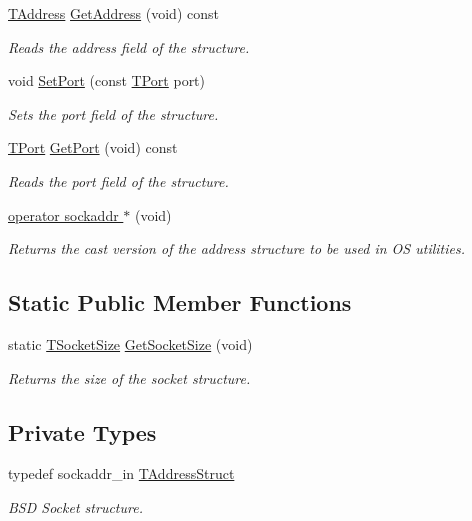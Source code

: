 \begin{DoxyCompactItemize}
\hyperlink{class_i_p_address_a36831f63346275f44e8747d77a2a5d51}{T\-Address} \hyperlink{class_i_p_address_a00ed9d09c9ec8f1d9568466683606e55}{Get\-Address} (void) const 
\begin{DoxyCompactList}\small\item\em Reads the address field of the structure. \end{DoxyCompactList}\item 
void \hyperlink{class_i_p_address_a5908d6242879f0e45685f8b0734dafa7}{Set\-Port} (const \hyperlink{class_i_p_address_a51188195685c31d4258c0a078cc37154}{T\-Port} port)
\begin{DoxyCompactList}\small\item\em Sets the port field of the structure. \end{DoxyCompactList}\item 
\hyperlink{class_i_p_address_a51188195685c31d4258c0a078cc37154}{T\-Port} \hyperlink{class_i_p_address_a92d27804d27e1fef93afd0137fe4eb08}{Get\-Port} (void) const 
\begin{DoxyCompactList}\small\item\em Reads the port field of the structure. \end{DoxyCompactList}\item 
\hyperlink{class_i_p_address_ac7a02f2b922b3b3c929ae3ad079ac8e9}{operator sockaddr $\ast$} (void)
\begin{DoxyCompactList}\small\item\em Returns the cast version of the address structure to be used in O\-S utilities. \end{DoxyCompactList}\end{DoxyCompactItemize}
\subsection*{Static Public Member Functions}
\begin{DoxyCompactItemize}
\item 
static \hyperlink{class_i_p_address_a28c76ca7e5d4aa86d2caf0b742a23cdb}{T\-Socket\-Size} \hyperlink{class_i_p_address_abdbc7cc25dc15d9e85ceb2e1d3125e22}{Get\-Socket\-Size} (void)
\begin{DoxyCompactList}\small\item\em Returns the size of the socket structure. \end{DoxyCompactList}\end{DoxyCompactItemize}
\subsection*{Private Types}
\begin{DoxyCompactItemize}
\item 
typedef sockaddr\-\_\-in \hyperlink{class_i_p_address_a45062a631f57459b18c10c1c8fe310bf}{T\-Address\-Struct}
\begin{DoxyCompactList}\small\item\em B\-S\-D Socket structure. \end{DoxyCompactList}\end{DoxyCompactItemize}

